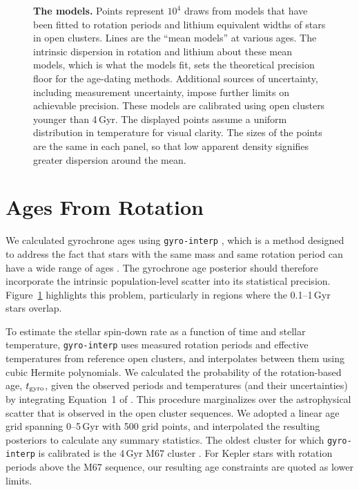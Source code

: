 \documentclass[11pt,twocolumn,tighten]{aastex63}
\begin{document}
\begin{figure}[!t]
	\begin{center}
		\leavevmode
	\end{center}
	\vspace{-0.6cm}
	\caption{
		{\bf The models.}
		Points represent $10^4$ draws from models that have been fitted to
		rotation periods \citep{Bouma_2023} and lithium equivalent widths
		\citep[EWs;][]{Jeffries_2023} of stars in open clusters.  Lines
		are the ``mean models'' at various ages.  The intrinsic dispersion
		in rotation and lithium about these mean models, which is what the
		models fit, sets the theoretical precision floor for the
		age-dating methods.    Additional sources of uncertainty,
		including measurement uncertainty, impose further limits on
		achievable precision.  These models are calibrated using open
		clusters younger than 4\,Gyr.  The displayed points assume a
		uniform distribution in temperature for visual clarity.  The sizes
		of the points are the same in each panel, so that low apparent
		density signifies greater dispersion around the mean.
		\label{fig:models}
	}
\end{figure}

\section{Ages From Rotation}
\label{sec:rotage}



We calculated gyrochrone ages using \texttt{gyro-interp}
\citep{Bouma_2023}, which is a method designed to address the fact
that stars with the same mass and same rotation period can have a wide
range of ages \citep[e.g.][]{Curtis_2019_ngc6811}.  The gyrochrone
age posterior should therefore incorporate the intrinsic
population-level scatter into its statistical precision.  Figure~\ref{fig:models} highlights this problem,
particularly in regions where the 0.1--1\,Gyr stars overlap.

To estimate the
stellar spin-down rate as a function of time and stellar temperature,
\texttt{gyro-interp} uses measured rotation periods and effective
temperatures from reference open clusters, and interpolates between them using cubic
Hermite polynomials.  We calculated the probability of the
rotation-based age, $t_{\rm gyro}$, given the observed 
periods and temperatures (and their uncertainties) by
integrating Equation~1 of \citet{Bouma_2023}.  This procedure marginalizes over the 
astrophysical scatter that is observed in the open cluster
sequences.
We adopted a linear age grid spanning 0--5\,Gyr with
500 grid points, and interpolated the resulting posteriors to calculate
any summary statistics.
The oldest cluster for which
\texttt{gyro-interp} is calibrated 
is the 4\,Gyr M67 cluster
\citep[][]{Dungee_2022,Gruner_2023}.  
For Kepler stars with rotation periods above the 
M67 sequence, our resulting age constraints are quoted as lower limits.
\end{document}
